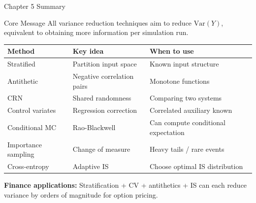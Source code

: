 \documentclass[aspectratio=169,10pt]{beamer}
\begin{document}

\begin{frame}{Chapter 5 Summary}

  \begin{block}{Core Message}
    All variance reduction techniques aim to reduce $\mathrm{Var}(Y)$,
    equivalent to obtaining more information per simulation run.
  \end{block}

  \medskip
  \begin{tabular}{lll}
    \toprule
    Method & Key idea & When to use \\
    \midrule
    Stratified & Partition input space & Known input structure \\
    Antithetic & Negative correlation pairs & Monotone functions \\
    CRN & Shared randomness & Comparing two systems \\
    Control variates & Regression correction & Correlated auxiliary known \\
    Conditional MC & Rao-Blackwell & Can compute conditional expectation \\
    Importance sampling & Change of measure & Heavy tails / rare events \\
    Cross-entropy & Adaptive IS & Choose optimal IS distribution \\
    \bottomrule
  \end{tabular}

  \medskip
  \textbf{Finance applications:}
  Stratification + CV + antithetics + IS can each reduce variance by
  orders of magnitude for option pricing.

\end{frame}
\end{document}
